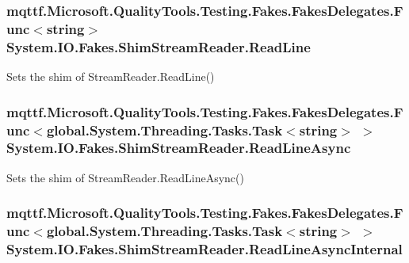 \hypertarget{class_system_1_1_i_o_1_1_fakes_1_1_shim_stream_reader_a0817b66b09bcf71f89159762cf9ac9cf}{
\subsubsection[{Read\-Line}]{\setlength{\rightskip}{0pt plus 5cm}mqttf.\-Microsoft.\-Quality\-Tools.\-Testing.\-Fakes.\-Fakes\-Delegates.\-Func$<$string$>$ System.\-I\-O.\-Fakes.\-Shim\-Stream\-Reader.\-Read\-Line\hspace{0.3cm}{\ttfamily [set]}}}\label{class_system_1_1_i_o_1_1_fakes_1_1_shim_stream_reader_a0817b66b09bcf71f89159762cf9ac9cf}


Sets the shim of Stream\-Reader.\-Read\-Line()

\hypertarget{class_system_1_1_i_o_1_1_fakes_1_1_shim_stream_reader_a55b881f43b92e1a211989c4f0721ddd3}{
\subsubsection[{Read\-Line\-Async}]{\setlength{\rightskip}{0pt plus 5cm}mqttf.\-Microsoft.\-Quality\-Tools.\-Testing.\-Fakes.\-Fakes\-Delegates.\-Func$<$global.\-System.\-Threading.\-Tasks.\-Task$<$string$>$ $>$ System.\-I\-O.\-Fakes.\-Shim\-Stream\-Reader.\-Read\-Line\-Async\hspace{0.3cm}{\ttfamily [set]}}}\label{class_system_1_1_i_o_1_1_fakes_1_1_shim_stream_reader_a55b881f43b92e1a211989c4f0721ddd3}


Sets the shim of Stream\-Reader.\-Read\-Line\-Async()

\hypertarget{class_system_1_1_i_o_1_1_fakes_1_1_shim_stream_reader_a0c96ac8a2009be03615d94cb996ad97f}{
\subsubsection[{Read\-Line\-Async\-Internal}]{\setlength{\rightskip}{0pt plus 5cm}mqttf.\-Microsoft.\-Quality\-Tools.\-Testing.\-Fakes.\-Fakes\-Delegates.\-Func$<$global.\-System.\-Threading.\-Tasks.\-Task$<$string$>$ $>$ System.\-I\-O.\-Fakes.\-Shim\-Stream\-Reader.\-Read\-Line\-Async\-Internal\hspace{0.3cm}{\ttfamily [set]}}}\label{class_system_1_1_i_o_1_1_fakes_1_1_shim_stream_reader_a0c96ac8a2009be03615d94cb996ad97f}


